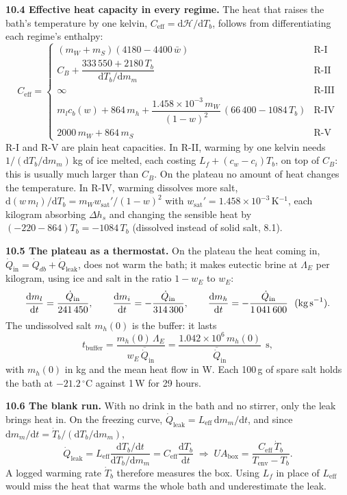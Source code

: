 \documentclass[11pt,a4paper]{article}
\newcommand{\dd}{\mathrm{d}}
\newcommand{\Hb}{\mathcal{H}}
\newcommand{\Qdb}{\dot Q_{db}}
\newcommand{\wsat}{w_{\mathrm{sat}}}
\newcommand{\Leff}{L_{\mathrm{eff}}}
\newcommand{\Ceff}{C_{\mathrm{eff}}}
\newcommand{\UAbox}{UA_{\mathrm{box}}}
\newcommand{\Tenv}{T_{\mathrm{env}}}
\newcommand{\dC}{\,{}^{\circ}\mathrm{C}}
\newcommand{\sub}[1]{\par\smallskip\noindent\textbf{#1}\enspace}
\begin{document}
\sub{10.4 Effective heat capacity in every regime.} The heat that raises the bath's temperature by one
kelvin, $\Ceff = \dd\Hb/\dd T_b$, follows from differentiating each regime's enthalpy:
\[
\Ceff =
\begin{cases}
(m_W+m_S)(4180 - 4400\,\bar w) & \text{R-I}\\[4pt]
C_B + \dfrac{333\,550 + 2180\,T_b}{\dd T_b/\dd m_m} & \text{R-II}\\[10pt]
\infty & \text{R-III}\\[4pt]
m_lc_b(w) + 864\,m_h + \dfrac{1.458\times10^{-3}\,m_W}{(1-w)^2}\,(66\,400 - 1084\,T_b) & \text{R-IV}\\[10pt]
2000\,m_W + 864\,m_S & \text{R-V}
\end{cases}
\]
R-I and R-V are plain heat capacities. In R-II, warming by one kelvin needs $1/(\dd T_b/\dd m_m)$\,kg of
ice melted, each costing $L_f + (c_w - c_i)T_b$, on top of $C_B$: this is usually much larger than $C_B$.
On the plateau no amount of heat changes the temperature. In R-IV, warming dissolves more salt,
$\dd(w\,m_l)/\dd T_b = m_W\wsat'/(1-w)^2$ with $\wsat' = 1.458\times10^{-3}$\,K$^{-1}$, each kilogram
absorbing $\Delta h_s$ and changing the sensible heat by $(-220 - 864)T_b = -1084\,T_b$ (dissolved instead
of solid salt, 8.1).

\sub{10.5 The plateau as a thermostat.} On the plateau the heat coming in, $\dot Q_{\mathrm{in}} = \Qdb +
\dot Q_{\mathrm{leak}}$, does not warm the bath; it makes eutectic brine at $\Lambda_E$ per kilogram, using ice
and salt in the ratio $1-w_E$ to $w_E$:
\[
\frac{\dd m_l}{\dd t} = \frac{\dot Q_{\mathrm{in}}}{241\,450},\qquad
\frac{\dd m_i}{\dd t} = -\frac{\dot Q_{\mathrm{in}}}{314\,300},\qquad
\frac{\dd m_h}{\dd t} = -\frac{\dot Q_{\mathrm{in}}}{1\,041\,600}\ \ (\text{kg\,s}^{-1}).
\]
The undissolved salt $m_h(0)$ is the buffer: it lasts
\[ t_{\mathrm{buffer}} = \frac{m_h(0)\,\Lambda_E}{w_E\,\overline{\dot Q}_{\mathrm{in}}} = \frac{1.042\times10^{6}\,m_h(0)}{\overline{\dot Q}_{\mathrm{in}}}\ \ \text{s}, \]
with $m_h(0)$ in kg and the mean heat flow in W. Each 100\,g of spare salt holds the bath at $-21.2\dC$
against 1\,W for 29 hours.

\sub{10.6 The blank run.} With no drink in the bath and no stirrer, only the leak brings heat in. On the
freezing curve, $\dot Q_{\mathrm{leak}} = \Leff\,\dd m_m/\dd t$, and since $\dd m_m/\dd t = \dot T_b/(\dd T_b/\dd m_m)$,
\[
\dot Q_{\mathrm{leak}} = \Leff\frac{\dd T_b/\dd t}{\dd T_b/\dd m_m} = \Ceff\frac{\dd T_b}{\dd t}
\;\Rightarrow\;
\UAbox = \frac{\Ceff\,\dot T_b}{\Tenv - T_b}.
\]
A logged warming rate $\dot T_b$ therefore measures the box. Using $L_f$ in place of $\Leff$ would miss the
heat that warms the whole bath and underestimate the leak.
\end{document}
